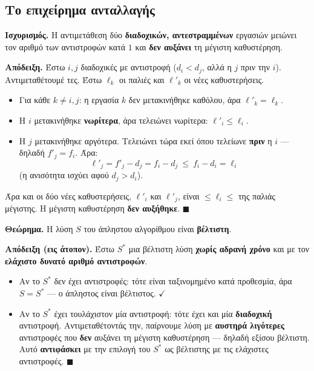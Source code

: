 \documentclass[11pt,a4paper]{article}
\begin{document}
\subsection{Το επιχείρημα ανταλλαγής}

\begin{keypoint}
\textbf{Ισχυρισμός.} Η αντιμετάθεση δύο \textbf{διαδοχικών, αντεστραμμένων}
εργασιών μειώνει τον αριθμό των αντιστροφών κατά $1$ και \textbf{δεν αυξάνει} τη
μέγιστη καθυστέρηση.
\end{keypoint}

\textbf{Απόδειξη.} Έστω $i, j$ διαδοχικές με αντιστροφή ($d_i < d_j$, αλλά η $j$
πριν την $i$). Αντιμεταθέτουμέ τες. Έστω $\ell_k$ οι παλιές και $\ell'_k$ οι
νέες καθυστερήσεις.
\begin{itemize}
  \item Για κάθε $k \ne i, j$: η εργασία $k$ δεν μετακινήθηκε καθόλου, άρα
  $\ell'_k = \ell_k$.
  \item Η $i$ μετακινήθηκε \textbf{νωρίτερα}, άρα τελειώνει νωρίτερα:
  $\ell'_i \le \ell_i$.
  \item Η $j$ μετακινήθηκε αργότερα. Τελειώνει τώρα εκεί όπου τελείωνε
  \textbf{πριν} η $i$ --- δηλαδή $f'_j = f_i$. Άρα:
  \[
  \ell'_j = f'_j - d_j = f_i - d_j \ \le\ f_i - d_i = \ell_i
  \]
  (η ανισότητα ισχύει αφού $d_j > d_i$).
\end{itemize}
Άρα και οι δύο νέες καθυστερήσεις, $\ell'_i$ και $\ell'_j$, είναι
$\le \ell_i \le$ της παλιάς μέγιστης. Η μέγιστη καθυστέρηση \textbf{δεν
αυξήθηκε}. $\blacksquare$

\begin{keypoint}
\textbf{Θεώρημα.} Η λύση $S$ του άπληστου αλγορίθμου είναι \textbf{βέλτιστη}.
\end{keypoint}

\textbf{Απόδειξη (εις άτοπον).} Έστω $S^*$ μια βέλτιστη λύση \textbf{χωρίς αδρανή
χρόνο} και με τον \textbf{ελάχιστο δυνατό αριθμό αντιστροφών}.
\begin{itemize}
  \item Αν το $S^*$ δεν έχει αντιστροφές: τότε είναι ταξινομημένο κατά
  προθεσμία, άρα $S = S^*$ --- ο άπληστος είναι βέλτιστος. $\checkmark$
  \item Αν το $S^*$ έχει τουλάχιστον μία αντιστροφή: τότε έχει και μία
  \textbf{διαδοχική} αντιστροφή. Αντιμεταθέτοντάς την, παίρνουμε λύση με
  \textbf{αυστηρά λιγότερες} αντιστροφές που \textbf{δεν} αυξάνει τη μέγιστη
  καθυστέρηση --- δηλαδή εξίσου βέλτιστη. Αυτό \textbf{αντιφάσκει} με την επιλογή
  του $S^*$ ως βέλτιστης με τις ελάχιστες αντιστροφές. $\blacksquare$
\end{itemize}
\end{document}
